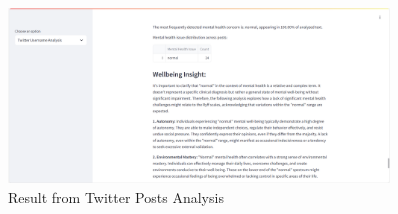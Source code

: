\pagebreak

\begin{figure}[h!]  
    \centering
    \includegraphics[width=0.9\textwidth]{App Images/10 Interface.png}  
    \caption{Result from Twitter Posts Analysis}
    \label{10i}  %
\end{figure}


